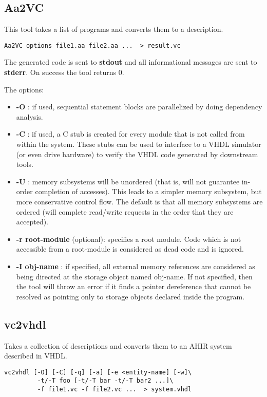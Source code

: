 \subsection{{\bf Aa2VC}}

This tool takes a list of \Aa programs and converts them
to a \vC description. 
\begin{verbatim}
Aa2VC options file1.aa file2.aa ...  > result.vc
\end{verbatim}
The generated \vC code is sent to {\bf stdout} and all informational
messages are sent to {\bf stderr}.  On success the tool returns 0.

The options:
\begin{itemize}
\item {\bf -O} : if used, sequential statement blocks are parallelized
by doing dependency analysis.
\item {\bf -C} : if used, a C stub is created for every module that
is not called from within the system.  These stubs can be used to
interface to a VHDL simulator (or even drive hardware) to verify
the VHDL code generated by downstream tools.
\item {\bf -U} : memory subsystems will be unordered (that is,
will not guarantee in-order completion of accesses).  This
leads to a simpler memory subsystem, but more conservative
control flow.  The default is that all memory subsystems
are ordered (will complete read/write requests in the order that
they are accepted).
\item {\bf -r root-module} (optional): specifies a root module.
Code which is not accessible from a root-module is considered
as dead code and is ignored.
\item {\bf -I obj-name} : if specified, all external memory references
are considered as being directed at the storage object named obj-name.
If not specified, then the tool will throw an error if it finds
a pointer dereference that cannot be resolved as pointing only to
storage objects declared inside the \Aa program.
\end{itemize}

\subsection{\bf vc2vhdl}

Takes a collection of \vC descriptions and converts them to
an AHIR system described in VHDL.
\begin{verbatim}
vc2vhdl [-O] [-C] [-q] [-a] [-e <entity-name] [-w]\
         -t/-T foo [-t/-T bar -t/-T bar2 ...]\
         -f file1.vc -f file2.vc ...  > system.vhdl
\end{verbatim}

